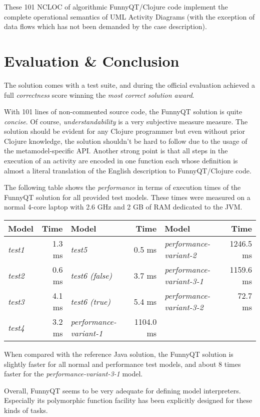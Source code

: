 \documentclass[submission]{eptcs}
\begin{document}
These 101 NCLOC of algorithmic FunnyQT/Clojure code implement the complete
operational semantics of UML Activity Diagrams (with the exception of data
flows which has not been demanded by the case description).

\section{Evaluation \& Conclusion}
\label{sec:evaluation}

The solution comes with a test suite, and during the official evaluation
achieved a full \emph{correctness} score winning the \emph{most correct
  solution award}.

With 101 lines of non-commented source code, the FunnyQT solution is quite
\emph{concise}.  Of course, \emph{understandability} is a very subjective
measure measure.  The solution should be evident for any Clojure programmer but
even without prior Clojure knowledge, the solution shouldn't be hard to follow
due to the usage of the metamodel-specific API.  Another strong point is that
all steps in the execution of an activity are encoded in one function each
whose definition is almost a literal translation of the English description to
FunnyQT/Clojure code.

The following table shows the \emph{performance} in terms of execution times of
the FunnyQT solution for all provided test models.  These times were measured
on a normal 4-core laptop with 2.6 GHz and 2 GB of RAM dedicated to the JVM.

\vspace{3pt}
\begin{tabular}{|l r | l r | l r |}
  \hline
  \textbf{Model} & \textbf{Time} & \textbf{Model} & \textbf{Time} & \textbf{Model} & \textbf{Time}\\
  \hline
  \emph{test1} & 1.3 ms & \emph{test5} & 0.5 ms & \emph{performance-variant-2} & 1246.5 ms\\
  \emph{test2} & 0.6 ms & \emph{test6 (false)} & 3.7 ms & \emph{performance-variant-3-1} & 1159.6 ms\\
  \emph{test3} & 4.1 ms & \emph{test6 (true)}  & 5.4 ms & \emph{performance-variant-3-2} & 72.7 ms\\
  \emph{test4} & 3.2 ms & \emph{performance-variant-1} & 1104.0 ms & &\\
  \hline
\end{tabular}
\vspace{3pt}

When compared with the reference Java solution, the FunnyQT solution is
slightly faster for all normal and performance test models, and about 8 times
faster for the \emph{performance-variant-3-1} model.

Overall, FunnyQT seems to be very adequate for defining model interpreters.
Especially its polymorphic function facility has been explicitly designed for
these kinds of tasks.




\end{document}
